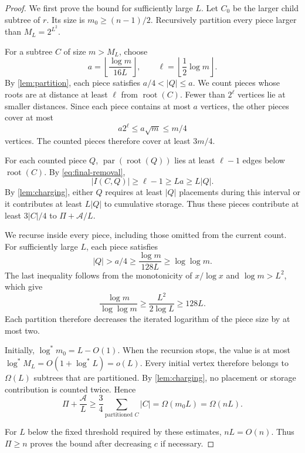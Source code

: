 \documentclass[11pt]{article}
\theoremstyle{definition}
\theoremstyle{remark}
\DeclareMathOperator{\parv}{par}
\newcommand{\Area}{\mathcal A}
\begin{document}
\begin{proof}
We first prove the bound for sufficiently large $L$.
Let $C_0$ be the larger child subtree of $r$.
Its size is $m_0\ge(n-1)/2$.
Recursively partition every piece larger than $M_L=2^{L^2}$.

For a subtree $C$ of size $m>M_L$, choose
\begin{equation}
a=\left\lfloor\frac{\log m}{16L}\right\rfloor, \qquad \ell=\left\lfloor\frac12\log m\right\rfloor.
\end{equation}
By \cref{lem:partition}, each piece satisfies $a/4<|Q|\le a$.
We count pieces whose roots are at distance at least $\ell$
from $\operatorname{root}(C)$.
Fewer than $2^\ell$ vertices lie at smaller distances.
Since each piece contains at most $a$ vertices, the other pieces
cover at most
\begin{equation}
a2^\ell\le a\sqrt m\le m/4
\end{equation}
vertices. The counted pieces therefore cover at least $3m/4$.

For each counted piece $Q$, $\parv(\operatorname{root}(Q))$
lies at least $\ell-1$ edges below $\operatorname{root}(C)$.
By \cref{eq:final-removal},
\begin{equation}
|I(C,Q)|\ge\ell-1\ge La\ge L|Q|.
\end{equation}
By \cref{lem:charging}, either $Q$ requires at least $|Q|$
placements during this interval or it contributes at least
$L|Q|$ to cumulative storage.
Thus these pieces contribute at least $3|C|/4$ to $\Pi+\Area/L$.

We recurse inside every piece, including those omitted
from the current count.
For sufficiently large $L$, each piece satisfies
\begin{equation}
|Q|>a/4\ge\frac{\log m}{128L}\ge\log\log m.
\end{equation}
The last inequality follows from the monotonicity of $x/\log x$
and $\log m>L^2$, which give
\begin{equation}
\frac{\log m}{\log\log m}\ge\frac{L^2}{2\log L}\ge128L.
\end{equation}
Each partition therefore decreases the iterated logarithm
of the piece size by at most two.

Initially, $\log^*m_0=L-O(1)$.
When the recursion stops, the value is at most
$\log^*M_L=O(1+\log^*L)=o(L)$.
Every initial vertex therefore belongs to $\Omega(L)$
subtrees that are partitioned.
By \cref{lem:charging}, no placement or storage contribution
is counted twice. Hence
\begin{equation}
\Pi+\frac{\Area}{L}\ge\frac34\sum_{\text{partitioned }C}|C|=\Omega(m_0L)=\Omega(nL).
\end{equation}

For $L$ below the fixed threshold required by these estimates,
$nL=O(n)$. Thus $\Pi\ge n$ proves the bound after decreasing
$c$ if necessary.
\end{proof}
\end{document}
